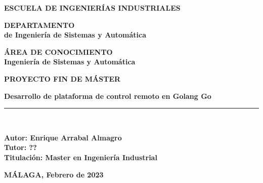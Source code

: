 \begin{center}
	\begin{large}
		\textbf {ESCUELA DE INGENIERÍAS INDUSTRIALES\\}
	\end{large}	
	\vspace*{0.5cm}
	\begin{large}
		\textbf {DEPARTAMENTO\\ de Ingeniería de Sistemas y Automática\\}		
	\end{large}	
	\vspace*{1cm}
	\begin{large}
		\textbf {ÁREA DE CONOCIMIENTO\\Ingeniería de Sistemas y Automática\\}
	\end{large}	
	\vspace*{1cm}	
	\begin{Huge}
		\textbf {PROYECTO FIN DE MÁSTER\\}
	\end{Huge}
	\vspace*{0.3cm}
	\begin{LARGE}
		\textbf {Desarrollo de plataforma de control remoto en Golang Go\\}
	\end{LARGE}
	\vspace*{0.3cm}
	\rule{5cm}{0.01cm}\\
	\vspace*{1cm}
	\begin{large}
		\textbf {Autor: Enrique Arrabal Almagro\\}
		\vspace*{0.5cm}
		\textbf {Tutor: ?? \\}
		\vspace*{1cm}
		\textbf{Titulación: Master en Ingeniería Industrial}
	\end{large}	
	\vspace*{3cm}
\begin{center}
\bf{MÁLAGA, Febrero de 2023}
\end{center}					
\end{center}
\thispagestyle{empty}

